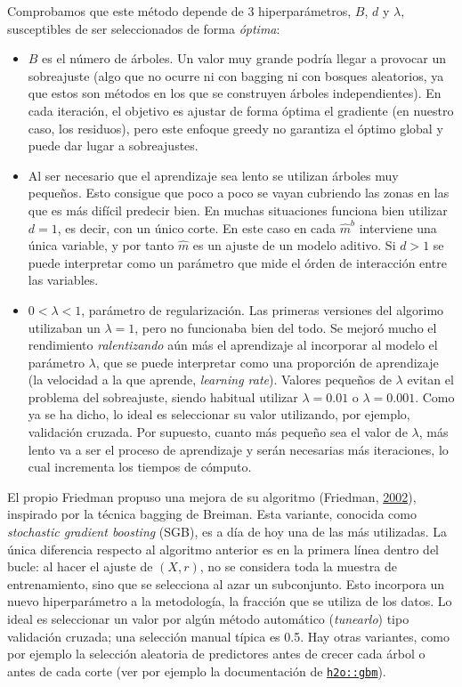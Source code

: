 \documentclass[
  spanish,
]{book}
\theoremstyle{break}
\theoremstyle{definition}
\theoremstyle{definition}
\theoremstyle{definition}
\theoremstyle{remark}
\begin{document}
Comprobamos que este método depende de 3 hiperparámetros, \(B\), \(d\) y \(\lambda\), susceptibles de ser seleccionados de forma \emph{óptima}:

\begin{itemize}
\item
  \(B\) es el número de árboles. Un valor muy grande podría llegar a provocar un sobreajuste (algo que no ocurre ni con bagging ni con bosques aleatorios, ya que estos son métodos en los que se construyen árboles independientes). En cada iteración, el objetivo es ajustar de forma óptima el gradiente (en nuestro caso, los residuos), pero este enfoque greedy no garantiza el óptimo global y puede dar lugar a sobreajustes.
\item
  Al ser necesario que el aprendizaje sea lento se utilizan árboles muy pequeños. Esto consigue que poco a poco se vayan cubriendo las zonas en las que es más difícil predecir bien. En muchas situaciones funciona bien utilizar \(d = 1\), es decir, con un único corte. En este caso en cada \(\hat m^b\) interviene una única variable, y por tanto \(\hat m\) es un ajuste de un modelo aditivo. Si \(d>1\) se puede interpretar como un parámetro que mide el órden de interacción entre las variables.
\item
  \(0 < \lambda < 1\), parámetro de regularización. Las primeras versiones del algorimo utilizaban un \(\lambda = 1\), pero no funcionaba bien del todo. Se mejoró mucho el rendimiento \emph{ralentizando} aún más el aprendizaje al incorporar al modelo el parámetro \(\lambda\), que se puede interpretar como una proporción de aprendizaje (la velocidad a la que aprende, \emph{learning rate}). Valores pequeños de \(\lambda\) evitan el problema del sobreajuste, siendo habitual utilizar \(\lambda = 0.01\) o \(\lambda = 0.001\). Como ya se ha dicho, lo ideal es seleccionar su valor utilizando, por ejemplo, validación cruzada. Por supuesto, cuanto más pequeño sea el valor de \(\lambda\), más lento va a ser el proceso de aprendizaje y serán necesarias más iteraciones, lo cual incrementa los tiempos de cómputo.
\end{itemize}

El propio Friedman propuso una mejora de su algoritmo (Friedman, \protect\hyperlink{ref-friedman2002stochastic}{2002}), inspirado por la técnica bagging de Breiman. Esta variante, conocida como \emph{stochastic gradient boosting} (SGB), es a día de hoy una de las más utilizadas.
La única diferencia respecto al algoritmo anterior es en la primera línea dentro del bucle: al hacer el ajuste de \((X, r)\), no se considera toda la muestra de entrenamiento, sino que se selecciona al azar un subconjunto.
Esto incorpora un nuevo hiperparámetro a la metodología, la fracción que se utiliza de los datos.
Lo ideal es seleccionar un valor por algún método automático (\emph{tunearlo}) tipo validación cruzada; una selección manual típica es 0.5.
Hay otras variantes, como por ejemplo la selección aleatoria de predictores antes de crecer cada árbol o antes de cada corte (ver por ejemplo la documentación de \href{http://docs.h2o.ai/h2o/latest-stable/h2o-docs/data-science/gbm.html}{\texttt{h2o::gbm}}).
\end{document}
